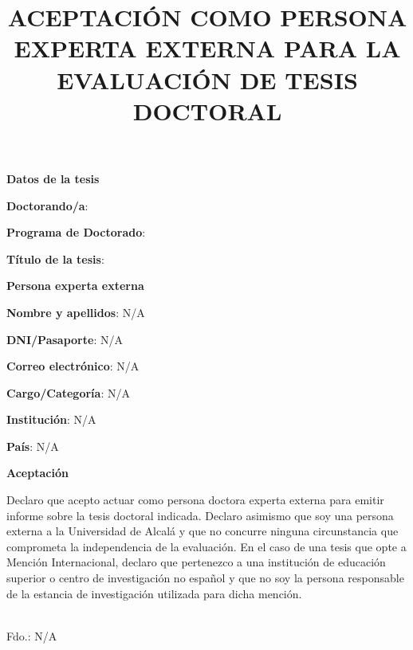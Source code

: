 \documentclass[11pt,a4paper,oneside]{article}
\title{ACEPTACIÓN COMO PERSONA EXPERTA EXTERNA PARA LA EVALUACIÓN DE TESIS DOCTORAL}
\date{}
\newcommand{\PhDFormSection}[1]{%
  \vspace{0.45cm}\noindent\textbf{\large #1}\par\smallskip}
\newcommand{\PhDFormField}[2]{%
  \noindent\textbf{#1}: #2\par}
\newcommand{\PhDNA}{N/A}
\providecommand{\myExternalExpertFullName}{\PhDNA}
\providecommand{\myExternalExpertDNI}{\PhDNA}
\providecommand{\myExternalExpertEmail}{\PhDNA}
\providecommand{\myExternalExpertInstitution}{\PhDNA}
\providecommand{\myExternalExpertCountry}{\PhDNA}
\providecommand{\myExternalExpertPosition}{\PhDNA}
\begin{document}
\maketitle
\thispagestyle{empty}

\PhDFormSection{Datos de la tesis}
\PhDFormField{Doctorando/a}{\myAuthorFullName}
\PhDFormField{Programa de Doctorado}{\myPhDProgram}
\PhDFormField{Título de la tesis}{\myBookTitle}

\PhDFormSection{Persona experta externa}
\PhDFormField{Nombre y apellidos}{\myExternalExpertFullName}
\PhDFormField{DNI/Pasaporte}{\myExternalExpertDNI}
\PhDFormField{Correo electrónico}{\myExternalExpertEmail}
\PhDFormField{Cargo/Categoría}{\myExternalExpertPosition}
\PhDFormField{Institución}{\myExternalExpertInstitution}
\PhDFormField{País}{\myExternalExpertCountry}

\PhDFormSection{Aceptación}
Declaro que acepto actuar como persona doctora experta externa para emitir informe sobre la tesis doctoral indicada. Declaro asimismo que soy una persona externa a la Universidad de Alcalá y que no concurre ninguna circunstancia que comprometa la independencia de la evaluación. En el caso de una tesis que opte a Mención Internacional, declaro que pertenezco a una institución de educación superior o centro de investigación no español y que no soy la persona responsable de la estancia de investigación utilizada para dicha mención.

\vfill
\begin{flushright}
\myPaperworkDate\\[1.5cm]
Fdo.: \myExternalExpertFullName
\end{flushright}
\end{document}
